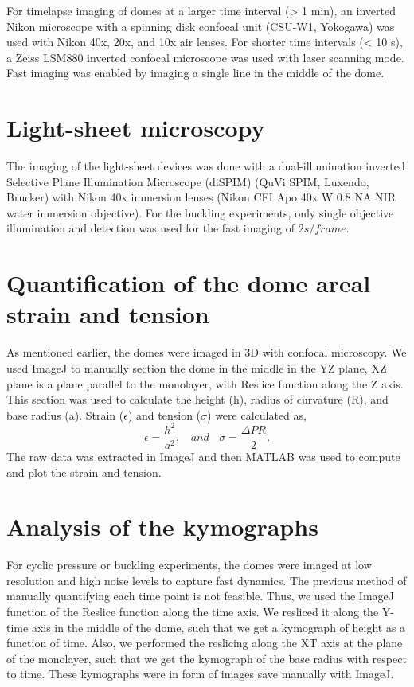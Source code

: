 For timelapse imaging of domes at a larger time interval (> 1 min), an inverted Nikon microscope with a spinning disk confocal unit (CSU-W1, Yokogawa) was used with Nikon 40x, 20x, and 10x air lenses. For shorter time intervals (< 10 s), a Zeiss LSM880 inverted confocal microscope was used with laser scanning mode. Fast imaging was enabled by imaging a single line in the middle of the dome. 

\section{Light-sheet microscopy}

The imaging of the light-sheet devices was done with a dual-illumination inverted Selective Plane Illumination Microscope (diSPIM) (QuVi SPIM, Luxendo, Brucker) with Nikon 40x immersion lenses (Nikon CFI Apo 40x W 0.8 NA NIR water immersion objective). For the buckling experiments, only single objective illumination and detection was used for the fast imaging of $2 s/frame$. 

\section{Quantification of the dome areal strain and tension}

As mentioned earlier, the domes were imaged in 3D with confocal microscopy. We used ImageJ to manually section the dome in the middle in the YZ plane, XZ plane is a plane parallel to the monolayer, with Reslice function along the Z axis. This section was used to calculate the height (h), radius of curvature (R), and base radius (a). Strain ($\epsilon$) and tension ($\sigma$) were calculated as,
$$\epsilon = \frac{h^2}{a^2}, \ \ \ \ and \ \ \ \ \sigma = \frac{\Delta P R}{2}.$$
The raw data was extracted in ImageJ and then MATLAB was used to compute and plot the strain and tension.

\section{Analysis of the kymographs}

For cyclic pressure or buckling experiments, the domes were imaged at low resolution and high noise levels to capture fast dynamics. The previous method of manually quantifying each time point is not feasible. Thus, we used the ImageJ function of the Reslice function along the time axis. We resliced it along the Y-time axis in the middle of the dome, such that we get a kymograph of height as a function of time. Also, we performed the reslicing along the XT axis at the plane of the monolayer, such that we get the kymograph of the base radius with respect to time. These kymographs were in form of images save manually with ImageJ. 

